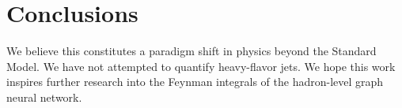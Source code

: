 \section{Conclusions}\label{sec:conclusions}

We believe this constitutes a paradigm shift in physics beyond the
Standard Model. We have not attempted to quantify heavy-flavor jets. We
hope this work inspires further research into the Feynman integrals of
the hadron-level graph neural network.

